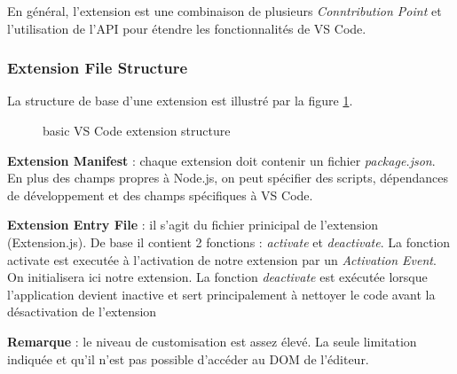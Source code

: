\documentclass[
    iict, %
    il, %
]{heig-tb}
\begin{document}
En général, l'extension est une combinaison de plusieurs \emph{Conntribution Point} et l'utilisation de l'API pour étendre les fonctionnalités de VS Code.

\subsubsection{Extension File Structure}\label{Extension File Structure}

La structure de base d'une extension est illustré par la figure \ref{basic VS Code extension structure}.

\begin{figure}[H] %
    \centering
    \caption[basic VS Code extension structure]{\label{basic VS Code extension structure} basic VS Code extension structure}
\end{figure}

\textbf{Extension Manifest} :
chaque extension doit contenir un fichier \emph{package.json}. En plus des champs propres à Node.js, on peut spécifier des scripts, dépendances de développement et des champs spécifiques à VS Code.

\textbf{Extension Entry File} :
il s'agit du fichier prinicipal de l'extension (Extension.js).
De base il contient 2 fonctions : \emph{activate} et \emph{deactivate}.
La fonction activate est executée à l'activation de notre extension par un \emph{Activation Event}. On initialisera ici notre extension.
La fonction \emph{deactivate} est exécutée lorsque l'application devient inactive et sert principalement à nettoyer le code avant la désactivation de l'extension

\textbf{Remarque} : le niveau de customisation est assez élevé. La seule limitation indiquée et qu'il n'est pas possible d'accéder au DOM de l'éditeur.
\end{document}
